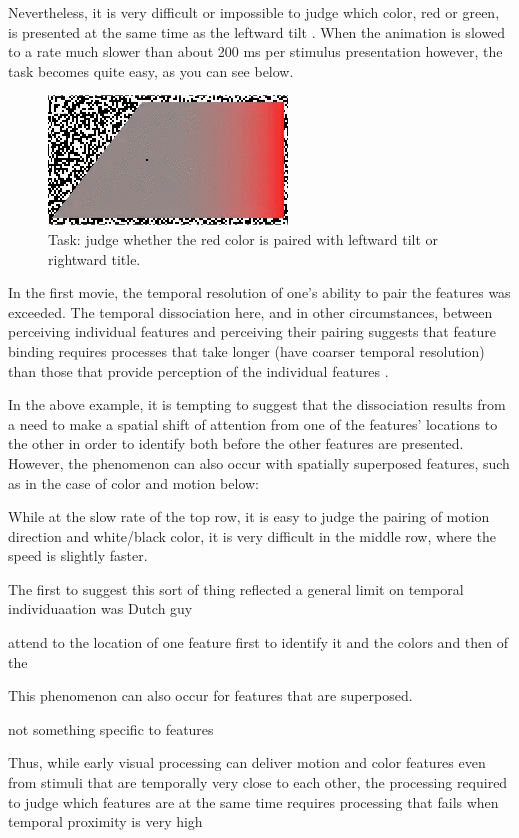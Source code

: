 \documentclass[
]{book}
\begin{document}
Nevertheless, it is very difficult or impossible to judge which color, red or green, is presented at the same time as the leftward tilt \citep{holcombeEarlyBindingFeature2001}. When the animation is slowed to a rate much slower than about 200 ms per stimulus presentation however, the task becomes quite easy, as you can see below.

\begin{figure}
\includegraphics[width=0.3\linewidth]{movies/binding/colorgrdnt2_2fpsStatic} \caption{Task: judge whether the red color is paired with leftward tilt or rightward title.}\label{fig:unnamed-chunk-8}
\end{figure}

In the first movie, the temporal resolution of one's ability to pair the features was exceeded. The temporal dissociation here, and in other circumstances, between perceiving individual features and perceiving their pairing suggests that feature binding requires processes that take longer (have coarser temporal resolution) than those that provide perception of the individual features \citep{holcombeSeeingSlowSeeing2009, fujisakiCommonPerceptualTemporal2010b}.

In the above example, it is tempting to suggest that the dissociation results from a need to make a spatial shift of attention from one of the features' locations to the other in order to identify both before the other features are presented. However, the phenomenon can also occur with spatially superposed features, such as in the case of color and motion below:

While at the slow rate of the top row, it is easy to judge the pairing of motion direction and white/black color, it is very difficult in the middle row, where the speed is slightly faster.

The first to suggest this sort of thing reflected a general limit on temporal individuaation was Dutch guy

attend to the location of one feature first to identify it and
the colors and then of the

This phenomenon can also occur for features that are superposed.

not something specific to features

Thus, while early visual processing can deliver motion and color features even from stimuli that are temporally very close to each other, the processing required to judge which features are at the same time requires processing that fails when temporal proximity is very high
\end{document}
